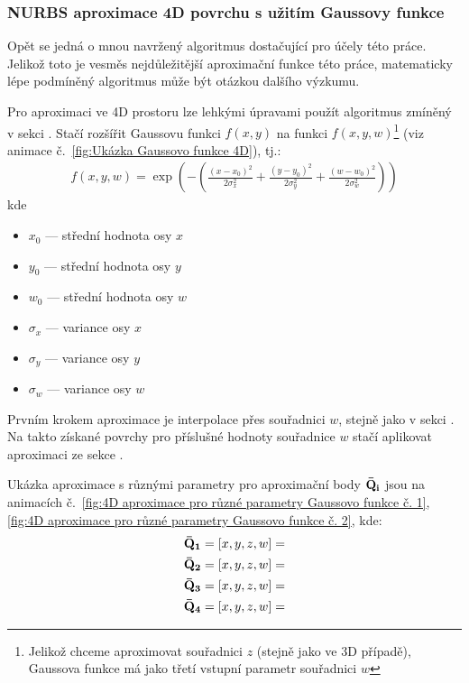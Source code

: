 \subsubsection{NURBS aproximace 4D povrchu s užitím Gaussovy funkce}
Opět se jedná o mnou navržený algoritmus dostačující pro účely této práce. Jelikož toto je vesměs nejdůležitější aproximační funkce této práce, matematicky lépe podmíněný algoritmus může být otázkou dalšího výzkumu.\par
Pro aproximaci ve 4D prostoru lze lehkými úpravami použít algoritmus zmíněný v
sekci . Stačí rozšířit
Gaussovu funkci $f(x,y)$ na funkci $f(x,y,w)$\footnote{Jelikož chceme
    aproximovat souřadnici $z$ (stejně jako ve 3D případě), Gaussova funkce má jako
    třetí vstupní parametr souřadnici $w$} (viz animace č.~\ref{fig:Ukázka Gaussovo
    funkce 4D}), tj.:
\begin{align}
    f(x,y,w) = \exp\left(-\left(\frac{(x - x_0)^2}{2\sigma_x^2} + \frac{(y - y_0)^2}{2\sigma_y^2} + \frac{(w - w_0)^2}{2\sigma_w^2} \right)\right)
\end{align}
kde
\begin{itemize}
    \item $x_0$ --- střední hodnota osy $x$
    \item $y_0$ --- střední hodnota osy $y$
    \item $w_0$ --- střední hodnota osy $w$
    \item $\sigma_x$ --- variance osy $x$
    \item $\sigma_y$ --- variance osy $y$
    \item $\sigma_w$ --- variance osy $w$
\end{itemize}
Prvním krokem aproximace je interpolace přes souřadnici $w$, stejně jako
v sekci . Na takto získané povrchy
pro příslušné hodnoty souřadnice $w$ stačí aplikovat aproximaci ze sekce .
\par
Ukázka aproximace s různými parametry pro aproximační body $\bf{\bar{Q}}_i$
jsou na animacích č.~\ref{fig:4D aproximace pro různé parametry Gaussovo funkce č. 1},
\ref{fig:4D aproximace pro různé parametry Gaussovo funkce č. 2}, kde:
\begin{align}
    \bf{\bar{Q}}_1 & = [x, y, z, w] =  \\
    \bf{\bar{Q}}_2 & = [x, y, z, w]=   \\
    \bf{\bar{Q}}_3 & = [x, y, z, w]=   \\
    \bf{\bar{Q}}_4 & = [x, y, z, w] = 
\end{align}
